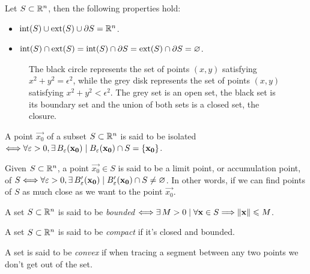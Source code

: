 \begin{prop}
	Let $S\subset\Rtn$, then the following properties hold:
	\begin{itemize}[itemsep = -2pt]
		\item $\interior{S}\cup\exterior{S}\cup\frontier{S} = \Rtn$.
		\item $\interior{S}\cap\exterior{S} = \interior{S}\cap\frontier{S} = \exterior{S}\cap\frontier{S} = \O$.
	\end{itemize}
\end{prop}

\begin{figure}[ht]
    \centering
    \caption{The black circle represents the set of points $(x, y)$ satisfying $x^2 + y^2 = \epsilon^2$, while the grey
    disk represents the set of points $(x, y)$ satisfying $x^2 + y^2 < \epsilon^2$. The grey set is an open set, the black
set is its boundary set and the union of both sets is a closed set, the closure.}
\end{figure}

\begin{defn}
A point $\vec{x_0}$ of a subset $S\subset\Rtn$ is said to be isolated $\iff\forall\epsilon > 0, \exists B_\epsilon\argopen(\vec{x_0}
	\argclose)\st B_\epsilon\argopen(\vec{x_0}\argclose)\cap S = \{\vec{x_0}\}$.
\end{defn}

\begin{defn}
Given $S\subset\Rtn$, a point $\vec{x_0}\in S$ is said to be a limit point, or accumulation point, of $S\iff\forall\epsilon > 0, 
	\exists B'_\epsilon\argopen(\vec{x_0}\argclose)\st B'_\epsilon\argopen(\vec{x_0}\argclose)\cap S\neq\O$. In other words, 
	if we can find points of $S$ as much close as we want to the point $\vec{x_0}$.
\end{defn}

\begin{defn}
A set $S\subset\Rtn$ is said to be \textit{bounded} $\iff\exists M > 0\st\forall\vec{x}\in S\implies \vnorm{\vec{x}}\leq M$.
\end{defn}

\begin{defn}
A set $S\subset\Rtn$ is said to be \textit{compact} if it's closed and bounded.
\end{defn}

\begin{defn}
A set is said to be \textit{convex} if when tracing a segment between any two points we don't get out of the set.
\end{defn}

